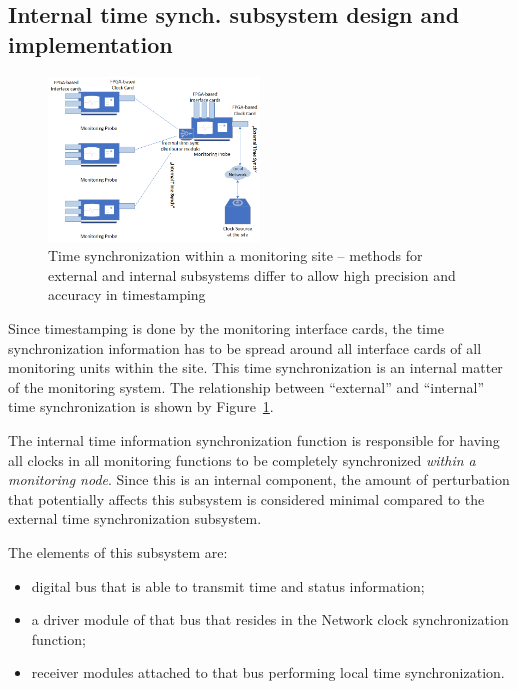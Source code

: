 \documentclass[journal]{IEEEtran}
\begin{document}
\subsection{Internal time synch. subsystem design and implementation}\label{sec:Internal-Impl}

\begin{figure}[!htb]
    \centering
    \includegraphics[width=0.5\textwidth]{figures_raw/TimeSynch_distribution.png}
    \caption{Time synchronization within a monitoring site -- methods for external and internal subsystems differ to allow high precision and accuracy in timestamping}
    \label{fig:TymeSinchArch}
\end{figure}

Since timestamping is done by the monitoring interface cards, the time synchronization information has to be spread around all interface cards of all monitoring units within the site. This time synchronization is an internal matter of the monitoring system. The relationship between ``external'' and ``internal'' time synchronization is shown by Figure~\ref{fig:TymeSinchArch}.

The internal time information synchronization function is responsible for having all clocks in all monitoring functions
to be completely synchronized \emph{within a monitoring node}. Since this is an internal component, the amount of perturbation
that potentially affects this subsystem is considered minimal compared to the external time synchronization subsystem.

The elements of this subsystem are:
\begin{itemize}
    \item digital bus that is able to transmit time and status information;
    \item a driver module of that bus that resides in the Network clock synchronization function;
    \item receiver modules attached to that bus performing local time synchronization.
\end{itemize}
\end{document}
